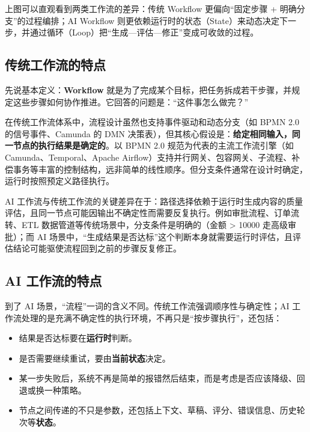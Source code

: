 \documentclass[9pt,a4paper,twocolumn]{ctexart}
\begin{document}
上图可以直观看到两类工作流的差异：传统 Workflow 更偏向“固定步骤 + 明确分支”的过程编排；AI Workflow 则更依赖运行时的状态（State）来动态决定下一步，并通过循环（Loop）把“生成—评估—修正”变成可收敛的过程。



\subsection*{传统工作流的特点}


先说基本定义：\textbf{Workflow} 就是为了完成某个目标，把任务拆成若干步骤，并规定这些步骤如何协作推进。它回答的问题是：“这件事怎么做完？”



在传统工作流体系中，流程设计虽然也支持事件驱动和动态分支（如 BPMN 2.0 的信号事件、Camunda 的 DMN 决策表），但其核心假设是：\textbf{给定相同输入，同一节点的执行结果是确定的}。以 BPMN 2.0 规范为代表的主流工作流引擎（如 Camunda、Temporal、Apache Airflow）支持并行网关、包容网关、子流程、补偿事务等丰富的控制结构，远非简单的线性顺序。但分支条件通常在设计时确定，运行时按照预定义路径执行。



AI 工作流与传统工作流的关键差异在于：路径选择依赖于运行时生成内容的质量评估，且同一节点可能因输出不确定性而需要反复执行。例如审批流程、订单流转、ETL 数据管道等传统场景中，分支条件是明确的（金额 > 10000 走高级审批）；而 AI 场景中，“生成结果是否达标”这个判断本身就需要运行时评估，且评估结论可能驱使流程回到之前的步骤反复修正。



\subsection*{AI 工作流的特点}


到了 AI 场景，“流程”一词的含义不同。传统工作流强调顺序性与确定性；AI 工作流处理的是充满不确定性的执行环境，不再只是“按步骤执行”，还包括：


\begin{itemize}[itemsep=1pt, topsep=2pt]
  \item 结果是否达标要在\textbf{运行时}判断。
  \item 是否需要继续重试，要由\textbf{当前状态}决定。
  \item 某一步失败后，系统不再是简单的报错然后结束，而是考虑是否应该降级、回退或换一种策略。
  \item 节点之间传递的不只是参数，还包括上下文、草稿、评分、错误信息、历史轮次等\textbf{状态}。
\end{itemize}
\end{document}
